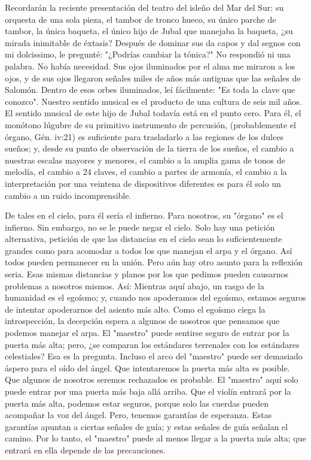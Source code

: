 \documentclass[12pt]{book}
\begin{document}
Recordarán la reciente presentación del teatro del isleño del Mar del Sur: su orquesta de una sola pieza, el tambor de tronco hueco, su único parche de tambor, la única baqueta, el único hijo de Jubal que manejaba la baqueta, ¿su mirada inimitable de éxtasis? Después de dominar sus da capos y dal segnos con mi dolcissimo, le pregunté: "¿Podrías cambiar la tónica?" No respondió ni una palabra. No había necesidad. Sus ojos iluminados por el alma me miraron a los ojos, y de sus ojos llegaron señales miles de años más antiguas que las señales de Salomón. Dentro de esos orbes iluminados, leí fácilmente: "Es toda la clave que conozco". Nuestro sentido musical es el producto de una cultura de seis mil años. El sentido musical de este hijo de Jubal todavía está en el punto cero. Para él, el monótono lúgubre de su primitivo instrumento de percusión, (probablemente el órgano, Gén. iv:21) es suficiente para trasladarlo a las regiones de los dulces sueños; y, desde su punto de observación de la tierra de los sueños, el cambio a nuestras escalas mayores y menores, el cambio a la amplia gama de tonos de melodía, el cambio a 24 claves, el cambio a partes de armonía, el cambio a la interpretación por una veintena de dispositivos diferentes es para él solo un cambio a un ruido incomprensible.

De tales en el cielo, para él sería el infierno. Para nosotros, su "órgano" es el infierno. Sin embargo, no se le puede negar el cielo. Solo hay una petición alternativa, petición de que las distancias en el cielo sean lo suficientemente grandes como para acomodar a todos los que manejan el arpa y el órgano. Así todos pueden permanecer en la unión. Pero aún hay otro asunto para la reflexión seria. Esas mismas distancias y planos por los que pedimos pueden causarnos problemas a nosotros mismos. Así: Mientras aquí abajo, un rasgo de la humanidad es el egoísmo; y, cuando nos apoderamos del egoísmo, estamos seguros de intentar apoderarnos del asiento más alto. Como el egoísmo ciega la introspección, la decepción espera a algunos de nosotros que pensamos que podemos manejar el arpa. El "maestro" puede sentirse seguro de entrar por la puerta más alta; pero, ¿se comparan los estándares terrenales con los estándares celestiales? Esa es la pregunta. Incluso el arco del "maestro" puede ser demasiado áspero para el oído del ángel. Que intentaremos la puerta más alta es posible. Que algunos de nosotros seremos rechazados es probable. El "maestro" aquí solo puede entrar por una puerta más baja allá arriba. Que el violín entrará por la puerta más alta, podemos estar seguros, porque solo las cuerdas pueden acompañar la voz del ángel. Pero, tenemos garantías de esperanza. Estas garantías apuntan a ciertas señales de guía; y estas señales de guía señalan el camino. Por lo tanto, el "maestro" puede al menos llegar a la puerta más alta; que entrará en ella depende de las precauciones.
\end{document}
